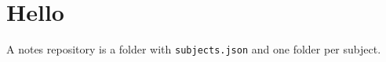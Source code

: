 \documentclass[11pt,a4paper,openany]{book}
\begin{document}
\tableofcontents
\chapter{Hello}
A notes repository is a folder with \texttt{subjects.json} and one folder per subject.
\end{document}
